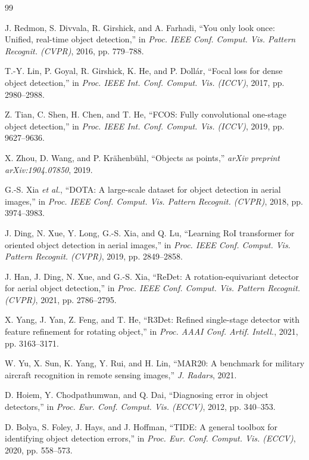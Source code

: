 \documentclass[conference]{IEEEtran}
\begin{document}
\begin{thebibliography}{99}

J. Redmon, S. Divvala, R. Girshick, and A. Farhadi, ``You only look once: Unified,
real-time object detection,'' in \emph{Proc. IEEE Conf. Comput. Vis. Pattern
Recognit. (CVPR)}, 2016, pp. 779--788.

T.-Y. Lin, P. Goyal, R. Girshick, K. He, and P. Doll\'ar, ``Focal loss for dense
object detection,'' in \emph{Proc. IEEE Int. Conf. Comput. Vis. (ICCV)}, 2017,
pp. 2980--2988.

Z. Tian, C. Shen, H. Chen, and T. He, ``FCOS: Fully convolutional one-stage object
detection,'' in \emph{Proc. IEEE Int. Conf. Comput. Vis. (ICCV)}, 2019, pp. 9627--9636.

X. Zhou, D. Wang, and P. Kr\"ahenb\"uhl, ``Objects as points,'' \emph{arXiv preprint
arXiv:1904.07850}, 2019.

G.-S. Xia \emph{et al.}, ``DOTA: A large-scale dataset for object detection in aerial
images,'' in \emph{Proc. IEEE Conf. Comput. Vis. Pattern Recognit. (CVPR)}, 2018,
pp. 3974--3983.

J. Ding, N. Xue, Y. Long, G.-S. Xia, and Q. Lu, ``Learning RoI transformer for
oriented object detection in aerial images,'' in \emph{Proc. IEEE Conf. Comput. Vis.
Pattern Recognit. (CVPR)}, 2019, pp. 2849--2858.

J. Han, J. Ding, N. Xue, and G.-S. Xia, ``ReDet: A rotation-equivariant detector for
aerial object detection,'' in \emph{Proc. IEEE Conf. Comput. Vis. Pattern Recognit.
(CVPR)}, 2021, pp. 2786--2795.

X. Yang, J. Yan, Z. Feng, and T. He, ``R3Det: Refined single-stage detector with
feature refinement for rotating object,'' in \emph{Proc. AAAI Conf. Artif. Intell.},
2021, pp. 3163--3171.

W. Yu, X. Sun, K. Yang, Y. Rui, and H. Lin, ``MAR20: A benchmark for military
aircraft recognition in remote sensing images,'' \emph{J. Radars}, 2021.

D. Hoiem, Y. Chodpathumwan, and Q. Dai, ``Diagnosing error in object detectors,''
in \emph{Proc. Eur. Conf. Comput. Vis. (ECCV)}, 2012, pp. 340--353.

D. Bolya, S. Foley, J. Hays, and J. Hoffman, ``TIDE: A general toolbox for
identifying object detection errors,'' in \emph{Proc. Eur. Conf. Comput. Vis.
(ECCV)}, 2020, pp. 558--573.


\end{thebibliography}
\end{document}

